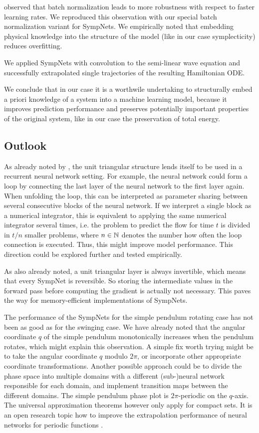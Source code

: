 \documentclass[twoside,a4paper]{article}
\begin{document}
\citeauthor{batchnorm-ioffe15} observed that batch normalization leads to more robustness
with respect to faster learning rates. We reproduced this observation with our special
batch normalization variant for SympNets.
We empirically noted that embedding physical knowledge into the structure of the model
(like in our case symplecticity) reduces overfitting.

We applied SympNets with convolution to the semi-linear wave
equation and successfully extrapolated single trajectories of the resulting Hamiltonian ODE.

We conclude that in our case
it is a worthwile undertaking to structurally embed a priori knowledge of a system
into a machine learning model, because it improves prediction performance
and preserves potentially important properties of the original system, 
like in our case the preservation of total energy.

\subsection{Outlook}\label{sec_outlook}

As already noted by \citeauthor{Jin2020}, the unit triangular structure lends itself
to be used in a recurrent neural network setting. For example, the neural network could 
form a loop by connecting the last layer of the neural network to the first layer again.
When unfolding the loop, this can be interpreted as parameter 
sharing between several consecutive blocks of the neural network. 
If we interpret a single block as a numerical integrator, this is equivalent to applying
the same numerical integrator several times, i.e. the problem to predict the flow for
time $t$ is divided in $t/n$ smaller problems, where $n \in \mathbb{N}$ denotes the number how often
the loop connection is executed. Thus, this might improve model performance. This
direction could be explored further and tested empirically.

As also \citeauthor{Jin2020} already noted, a unit triangular layer is always invertible, 
which means that every SympNet is reversible. So storing the intermediate values
in the forward pass before computing the gradient is actually not necessary. This
paves the way for memory-efficient implementations of SympNets.

The performance of the SympNets for the simple pendulum rotating case has not been as good
as for the swinging case. We have already noted that the angular coordinate $q$
of the simple pendulum monotonically increases when the pendulum rotates,
which might explain this observation. A simple fix worth trying might be
to take the angular coordinate $q$ modulo $2\pi$, or incorporate other appropriate
coordinate transformations. Another possible approach could be to divide the
phase space into multiple domains with a different (sub-)neural network
responsible for each domain, and implement transition maps between the different
domains. The simple pendulum phase plot is $2\pi$-periodic on the $q$-axis.
The universal approximation theorems however only apply for compact sets.
It is an open research topic how to improve the extrapolation performance
of neural networks for periodic functions \cite{Ziyin2020}.
\end{document}

